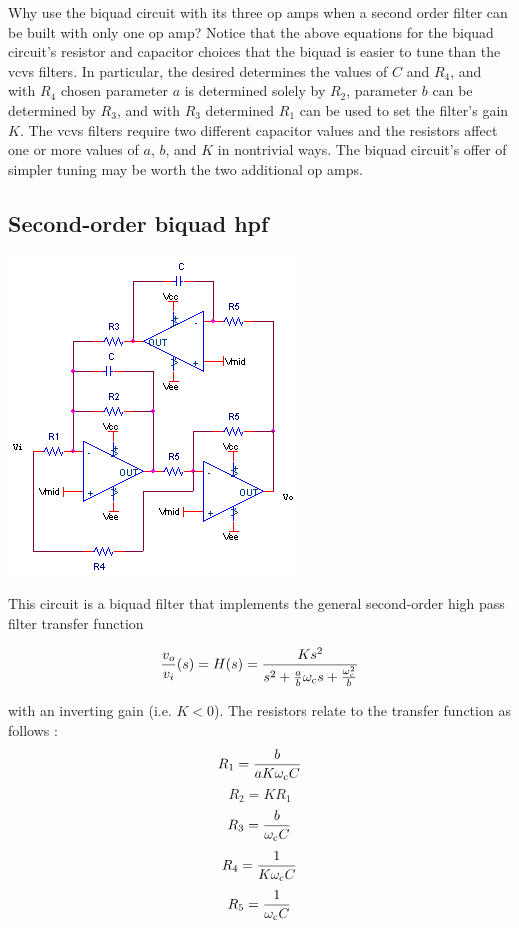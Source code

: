 Why use the biquad circuit with its three op amps when a second order filter can be built with only one op amp?
Notice that the above equations for the biquad circuit's resistor and capacitor choices that the biquad is easier to tune than the \ac{vcvs} filters.
In particular, the desired \wcutoff determines the values of $C$ and $R_4$, and with $R_4$ chosen parameter $a$ is determined solely by $R_2$, parameter $b$ can be determined by $R_3$, and with $R_3$ determined $R_1$ can be used to set the filter's gain $K$.
The \ac{vcvs} filters require two different capacitor values and the resistors affect one or more values of $a$, $b$, and $K$ in nontrivial ways.
The biquad circuit's offer of simpler tuning may be worth the two additional op amps. \autocite[120-122]{op-amp-circuits-johnson}

\subsection{Second-order biquad \acl{hpf}}
\begin{center}
	\includegraphics{schematics/2ndorderbiquadHPfilter.PNG}
\end{center}
This circuit is a biquad filter that implements the general second-order high pass filter transfer function

\textcolor{red}{
\begin{equation}
\frac{\vout}{\vin}(s) = \Hs = \frac{Ks^2}{s^2 + \frac{a}{b}\wcutoff s + \frac{\wcutoff^2}{b}}
\label{eq:2ndorderbiquadHPfilter}
\end{equation}
}

with an inverting gain (i.e. $K < 0$).
The resistors relate to the transfer function as follows \autocite[131]{op-amp-circuits-johnson}:
\begin{equation}
R_1 = \frac{b}{a K\omega_\mathrm{c} C}
\end{equation}
\begin{equation}
R_2 = K R_1
\end{equation}
\begin{equation}
R_3 = \frac{b}{\omega_\mathrm{c} C}
\end{equation}
\begin{equation}
R_4 = \frac{1}{K\omega_\mathrm{c} C}
\end{equation}
\begin{equation}
R_5 = \frac{1}{\omega_\mathrm{c} C}
\end{equation}

